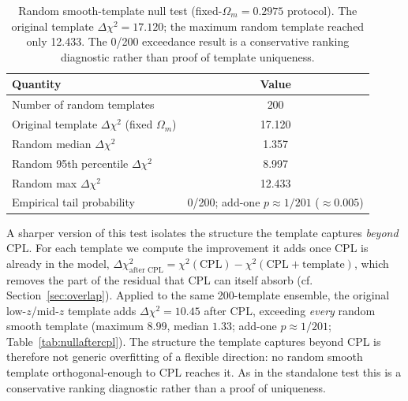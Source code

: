 \documentclass[11pt]{article}
\begin{document}
\begin{table}[h]
\centering
\caption{Random smooth-template null test (fixed-$\Omega_m=0.2975$ protocol). The
original template $\Delta\chi^2=17.120$; the maximum random template reached only
12.433. The 0/200 exceedance result is a conservative ranking diagnostic rather than
proof of template uniqueness.}
\label{tab:null}
\begin{tabular}{lc}
\toprule
Quantity & Value \\
\midrule
Number of random templates & 200 \\
Original template $\Delta\chi^2$ (fixed $\Omega_m$) & 17.120 \\
Random median $\Delta\chi^2$ & 1.357 \\
Random 95th percentile $\Delta\chi^2$ & 8.997 \\
Random max $\Delta\chi^2$ & 12.433 \\
Empirical tail probability & 0/200; add-one $p\approx1/201$ ($\approx0.005$) \\
\bottomrule
\end{tabular}
\end{table}

A sharper version of this test isolates the structure the template captures
\emph{beyond} CPL. For each template we compute the improvement it adds once CPL
is already in the model,
$\Delta\chi^2_{\text{after CPL}}=\chi^2(\text{CPL})-\chi^2(\text{CPL}+\text{template})$,
which removes the part of the residual that CPL can itself absorb (cf.
Section~\ref{sec:overlap}). Applied to the same 200-template ensemble, the
original low-$z$/mid-$z$ template adds $\Delta\chi^2=10.45$ after CPL, exceeding
\emph{every} random smooth template (maximum $8.99$, median $1.33$; add-one
$p\approx1/201$; Table~\ref{tab:nullaftercpl}). The structure the template
captures beyond CPL is therefore not generic overfitting of a flexible direction:
no random smooth template orthogonal-enough to CPL reaches it. As in the standalone
test this is a conservative ranking diagnostic rather than a proof of uniqueness.
\end{document}

